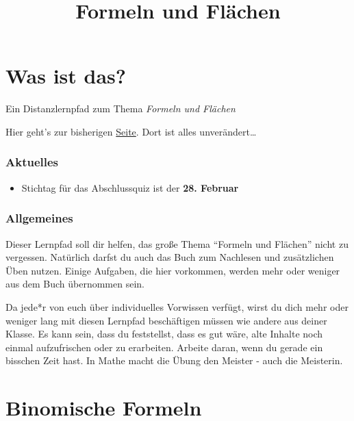 \documentclass[
  ngerman,
]{book}
\title{Formeln und Flächen}
\author{}
\date{\vspace{-2.5em}}
\providecommand{\tightlist}{%
  \setlength{\itemsep}{0pt}\setlength{\parskip}{0pt}}
\begin{document}
\maketitle

{
\setcounter{tocdepth}{1}
\tableofcontents
}
\hypertarget{was-ist-das}{%
\chapter*{Was ist das?}\label{was-ist-das}}

Ein Distanzlernpfad zum Thema \emph{Formeln und Flächen}

Hier geht's zur bisherigen \href{https://gdischinger.github.io/Mathe_8d/03FormelnErstellen/FlächenberechnungErinnerung.html}{Seite}. Dort ist alles unverändert\ldots{}

\hypertarget{aktuelles}{%
\subsection*{Aktuelles}\label{aktuelles}}

\begin{itemize}
\tightlist
\item
  Stichtag für das Abschlussquiz ist der \textbf{28. Februar}
\end{itemize}

\hypertarget{allgemeines}{%
\subsection*{Allgemeines}\label{allgemeines}}

Dieser Lernpfad soll dir helfen, das große Thema ``Formeln und Flächen'' nicht zu vergessen. Natürlich darfst du auch das Buch zum Nachlesen und zusätzlichen Üben nutzen. Einige Aufgaben, die hier vorkommen, werden mehr oder weniger aus dem Buch übernommen sein.

Da jede*r von euch über individuelles Vorwissen verfügt, wirst du dich mehr oder weniger lang mit diesen Lernpfad beschäftigen müssen wie andere aus deiner Klasse. Es kann sein, dass du feststellst, dass es gut wäre, alte Inhalte noch einmal aufzufrischen oder zu erarbeiten. Arbeite daran, wenn du gerade ein bisschen Zeit hast. In Mathe macht die Übung den Meister - auch die Meisterin.

\hypertarget{binomische-formeln}{%
\chapter{Binomische Formeln}\label{binomische-formeln}}
\end{document}
